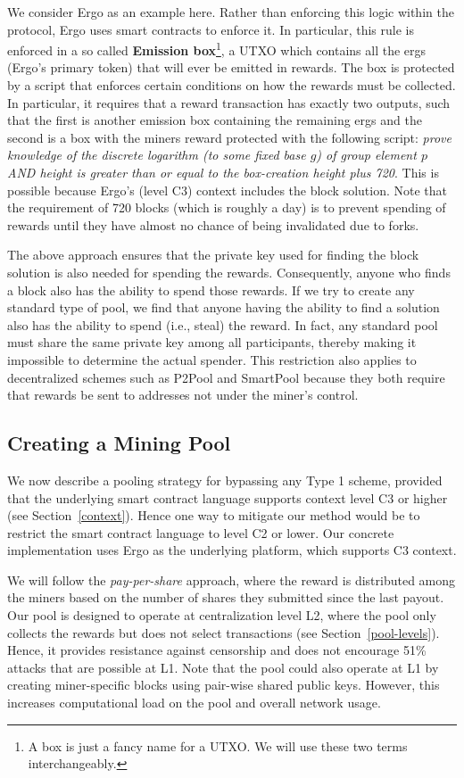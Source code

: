 \documentclass{llncs}
\begin{document}
We consider Ergo as an example here. Rather than enforcing this logic within the protocol, Ergo uses smart contracts to enforce it. In particular, this rule is enforced in a so called \textbf{Emission box}\footnote{A box is just a fancy name for a UTXO. We will use these two terms interchangeably.}, a UTXO which contains all the ergs (Ergo's primary token) that will ever be emitted in rewards. The box is protected by a script that enforces certain conditions on how the rewards must be collected. In particular, it requires that a reward transaction has exactly two outputs, such that the first is another emission box containing the remaining ergs and the second is a box with the miners reward protected with the following script: {\em prove knowledge of the discrete logarithm (to some fixed base $g$) of group element $p$ AND height is greater than or equal to the box-creation height plus 720}.
This is possible because Ergo's (level C3) context includes the block solution. Note that the requirement of 720 blocks (which is roughly a day) is to prevent spending of rewards until they have almost no chance of being invalidated due to forks.

The above approach ensures that the private key used for finding the block solution is also needed for spending the rewards. Consequently, anyone who finds a block also has the ability to spend those rewards. 
If we try to create any standard type of pool, we find that anyone having the ability to find a solution also has the ability to spend (i.e., steal) the reward. In fact, any standard pool must share the same private key among all participants, thereby making it impossible to determine the actual spender. This restriction also applies to decentralized schemes such as P2Pool and SmartPool because they both require that rewards be sent to addresses not under the miner's control.

\subsection{Creating a Mining Pool}

We now describe a pooling strategy for bypassing any Type 1 scheme, provided that the underlying smart contract language supports context level C3 or higher (see Section~\ref{context}). Hence one way to mitigate our method would be to restrict the smart contract language to level C2 or lower. Our concrete implementation uses Ergo as the underlying platform, which supports C3 context. 

We will follow the {\em pay-per-share} approach, where the reward is distributed among the miners based on the number of shares they submitted since the last payout. Our pool is designed to operate at centralization level L2, where the pool only collects the rewards but does not select transactions (see Section~\ref{pool-levels}). Hence, it provides resistance against censorship and does not encourage 51\% attacks that are possible at L1. Note that the pool could also operate at L1 by creating miner-specific blocks using pair-wise shared public keys. However, this increases computational load on the pool and overall network usage. 
\end{document}
